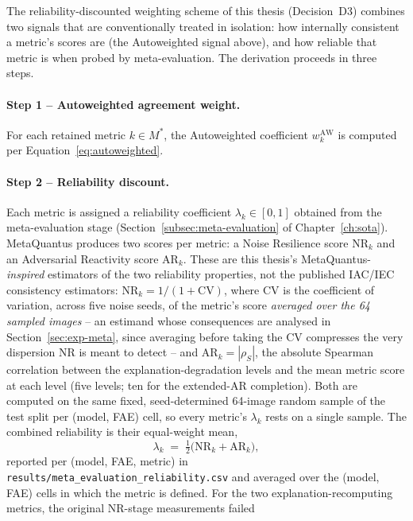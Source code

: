 The reliability-discounted weighting scheme of this thesis (Decision~D3)
combines two signals
that are conventionally treated in isolation: how internally consistent a
metric's scores are (the Autoweighted signal above), and how reliable that
metric is when probed by meta-evaluation. The derivation proceeds in three
steps.

\paragraph{Step 1 -- Autoweighted agreement weight.}
For each retained metric $k \in M^{*}$, the Autoweighted coefficient
$w_k^{\mathrm{AW}}$ is computed per Equation~\eqref{eq:autoweighted}.

\paragraph{Step 2 -- Reliability discount.}
Each metric is assigned a reliability coefficient $\lambda_k \in [0, 1]$
obtained from the meta-evaluation stage
(Section~\ref{subsec:meta-evaluation} of Chapter~\ref{ch:sota}). MetaQuantus
produces two scores per metric: a Noise Resilience score $\mathrm{NR}_k$ and
an Adversarial Reactivity score $\mathrm{AR}_k$. These are this thesis's
MetaQuantus-\emph{inspired} estimators of the two reliability properties,
not the published IAC/IEC consistency estimators:
$\mathrm{NR}_k = 1/(1 + \mathrm{CV})$, where CV is the coefficient of
variation, across five noise seeds, of the metric's score
\emph{averaged over the 64 sampled images} -- an estimand whose
consequences are analysed in Section~\ref{sec:exp-meta}, since averaging
before taking the CV compresses the very dispersion NR is meant to
detect -- and
$\mathrm{AR}_k = |\rho_S|$, the absolute Spearman correlation between the
explanation-degradation levels and the mean metric score at each level
(five levels; ten for the extended-AR completion).
Both are computed on the same fixed, seed-determined 64-image random sample
of the test split per
(model, FAE) cell, so every metric's $\lambda_k$ rests on a single sample.
The combined
reliability is their equal-weight mean,
\begin{equation}
    \lambda_k \;=\; \tfrac{1}{2}\bigl(\mathrm{NR}_k + \mathrm{AR}_k\bigr),
    \label{eq:lambda}
\end{equation}
reported per (model, FAE, metric) in
\texttt{results/meta\_evaluation\_reliability.csv} and averaged over the
(model, FAE) cells in which the metric is defined. For the two
explanation-recomputing metrics, the original NR-stage measurements failed
